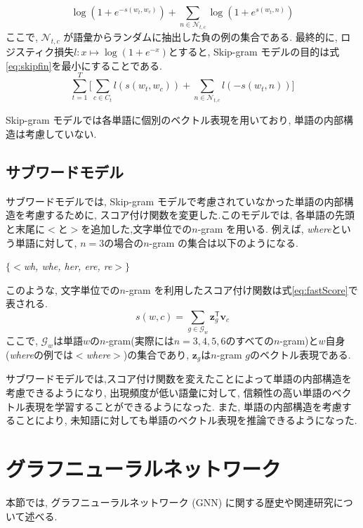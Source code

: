 \documentclass[a4j,twoside,12pt,dvipdfmx]{thesis} %
\begin{document}
\begin{equation}
  \label{eq:loglike}
  \log (1 + e^{-s(w_{t}, w_{c})}) + \sum_{n \in \mathcal{N}_{t,c}} \log (1 + e^{s(w_{t}, n)})
\end{equation}
ここで, $\mathcal{N}_{t,c}$ が語彙からランダムに抽出した負の例の集合である.
最終的に, ロジスティク損失$l : x \mapsto \log(1+e^{-x})$とすると, Skip-gram モデルの目的は式\ref{eq:skipfin}を最小にすることである.
\begin{equation}
  \label{eq:skipfin}
  \sum_{t=1}^{T} \Biggl\lbrack \sum_{c \in C_{t}} l(s(w_{t}, w_{c})) + \sum_{n \in \mathcal{N}_{t,c}} l(-s(w_{t}, n))\Biggr\rbrack
\end{equation}

\par Skip-gram モデルでは各単語に個別のベクトル表現を用いており, 単語の内部構造は考慮していない.

\subsection{サブワードモデル}
サブワードモデルでは, Skip-gram モデルで考慮されていなかった単語の内部構造を考慮するために, スコア付け関数を変更した.このモデルでは, 各単語の先頭と末尾に$<$と$>$を追加した,文字単位での$n$-gram を用いる. 例えば, \textsl{where}という単語に対して, $n=3$の場合の$n$-gram の集合は以下のようになる.
\centerline{$\{<$\textsl{wh, whe, her, ere, re}$>\}$}
このような, 文字単位での$n$-gram を利用したスコア付け関数は式\ref{eq:fastScore}で表される.
\begin{equation}
  \label{eq:fastScore}
  s(w,c) = \sum_{g\in \mathcal{G}_{w}} \mathbf{z}_{g}^\mathsf{T}\mathbf{v}_{c}
\end{equation}
ここで, $\mathcal{G}_{w}$は単語$w$の$n$-gram(実際には$n=3,4,5,6$のすべての$n$-gram)と$w$自身(\textsl{where}の例では$<$\textsl{where}$>$)の集合であり, $\mathbf{z}_{g}$は$n$-gram $g$のベクトル表現である.
\par サブワードモデルでは,スコア付け関数を変えたことによって単語の内部構造を考慮できるようになり, 出現頻度が低い語彙に対して, 信頼性の高い単語のベクトル表現を学習することができるようになった.
また, 単語の内部構造を考慮することにより, 未知語に対しても単語のベクトル表現を推論できるようになった.


\section{グラフニューラルネットワーク}\label{rel:GNN}
本節では, グラフニューラルネットワーク (GNN) に関する歴史や関連研究について述べる.
\end{document}
